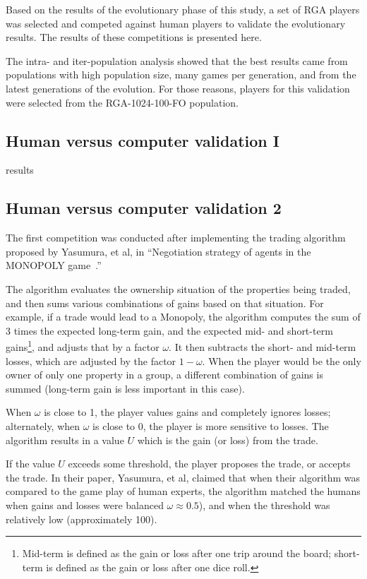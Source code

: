 Based on the results of the evolutionary phase of this study, a set of RGA
players was selected and competed against human players to validate the
evolutionary results. The results of these competitions is presented here.

The intra- and iter-population analysis showed that the best results came from
populations with high population size, many games per generation, and from the
latest generations of the evolution. For those reasons, players for this
validation were selected from the RGA-1024-100-FO population.

\subsection{Human versus computer validation I}\label{6_humanVRGA1}

results

\subsection{Human versus computer validation 2} \label{6_humanVRGA2}

The first competition was conducted after implementing the trading algorithm
proposed by Yasumura, et al, in ``Negotiation strategy of agents in the MONOPOLY
game~\cite{Yasumura2001Negotiate}.''

The algorithm evaluates the ownership situation of the properties being traded,
and then sums various combinations of gains based on that situation. For
example, if a trade would lead to a Monopoly, the algorithm computes the sum of
3 times the expected long-term gain, and the expected mid- and short-term
gains\footnote{Mid-term is defined as the gain or loss after one trip around the
board; short-term is defined as the gain or loss after one dice roll.}, and
adjusts that by a factor \(\omega\). It then subtracts the short- and mid-term
losses, which are adjusted by the factor \(1-\omega\). When the player would be
the only owner of only one property in a group, a different combination of
gains is summed (long-term gain is less important in this case).

When \(\omega\) is close to 1, the player values gains and completely ignores
losses; alternately, when \(\omega\) is close to 0, the player is more sensitive
to losses. The algorithm results in a value \(U\) which is the gain (or loss)
from the trade.

If the value \(U\) exceeds some threshold, the player proposes the trade, or
accepts the trade. In their paper, Yasumura, et al, claimed that when their
algorithm was compared to the game play of human experts, the algorithm matched
the humans when gains and losses were balanced \(\omega \approx 0.5\)), and when
the threshold was relatively low (approximately 100).


